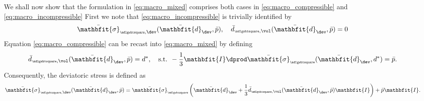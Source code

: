 \documentclass[a4paper,11pt]{article}
\renewcommand{\ts}[1]{\mathbfit{#1}}
\renewcommand{\Box}{{\scalebox{0.5}{\mdlgwhtsquare}}}
\begin{document}
We shall now show that the formulation in \eqref{eq:macro_mixed} comprises both cases in \eqref{eq:macro_compressible} and \eqref{eq:macro_incompressible}
First we note that \eqref{eq:macro_incompressible} is trivially identified by 
\begin{align}
 \bar{\ts\sigma}_{\Box,\dev}(\bar{\ts d}_\dev, \bar p), \quad \bar{d}_{\Box,\vol}(\bar{\ts d}_\dev,\bar p) = 0
\end{align}
Equation \eqref{eq:macro_compressible} can be recast into \eqref{eq:macro_mixed} by defining
\begin{align}
 \bar d_{\Box,\vol}(\bar{\ts d}_\dev, \bar p) = d^*,\quad \text{s.t. } -\frac13 \ts I\dprod \bar{\ts\sigma}_\Box(\bar{\ts d}_\dev, d^*) = \bar p.
\end{align}
Consequently, the deviatoric stress is defined as
\begin{align}
 \bar{\ts\sigma}_{\Box,\dev}(\bar{\ts d}_\dev,\bar p) = \bar{\ts\sigma}_\Box\left(\bar{\ts d}_\dev + \frac13 \bar{d}_{\Box,\vol}(\bar{\ts d}_\dev,\bar p)\ts I\right) + \bar p\ts I.
\end{align}
\end{document}
